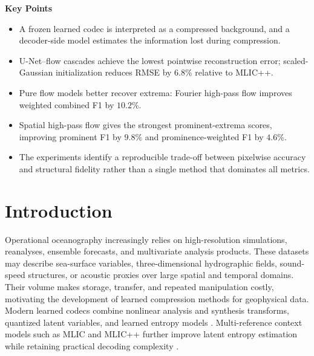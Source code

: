 \documentclass[11pt]{article}
\begin{document}
\noindent\textbf{Key Points}
\begin{itemize}[leftmargin=1.5em]
    \item A frozen learned codec is interpreted as a compressed background, and a decoder-side model estimates the information lost during compression.
    \item U-Net--flow cascades achieve the lowest pointwise reconstruction error; scaled-Gaussian initialization reduces RMSE by $6.8\%$ relative to MLIC++.
    \item Pure flow models better recover extrema: Fourier high-pass flow improves weighted combined F1 by $10.2\%$.
    \item Spatial high-pass flow gives the strongest prominent-extrema scores, improving prominent F1 by $9.8\%$ and prominence-weighted F1 by $4.6\%$.
    \item The experiments identify a reproducible trade-off between pixelwise accuracy and structural fidelity rather than a single method that dominates all metrics.
\end{itemize}

\section{Introduction}

Operational oceanography increasingly relies on high-resolution simulations, reanalyses, ensemble forecasts, and multivariate analysis products. These datasets may describe sea-surface variables, three-dimensional hydrographic fields, sound-speed structures, or acoustic proxies over large spatial and temporal domains. Their volume makes storage, transfer, and repeated manipulation costly, motivating the development of learned compression methods for geophysical data. Modern learned codecs combine nonlinear analysis and synthesis transforms, quantized latent variables, and learned entropy models \cite{balle2018variational,minnen2018joint}. Multi-reference context models such as MLIC and MLIC++ further improve latent entropy estimation while retaining practical decoding complexity \cite{jiang2023mlic,jiang2025mlicpp}.
\end{document}
